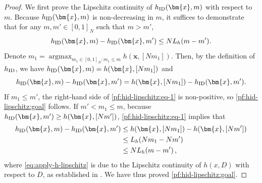 \documentclass{article}
\theoremstyle{plain}
\theoremstyle{remark}
\newcommand{\mx}{\bm{x}}
\newcommand{\hid}{h_{\textnormal{ID}}}
\newcommand{\ID}{\textnormal{ID}}
\DeclareMathOperator*{\argmax}{argmax}
\begin{document}
\begin{proof}\label{proof:hID drift}
    We first prove the Lipschitz continuity of $\hid(\mx, m)$ with respect to $m$. 
    Because $\hid(\mx, m)$ is non-decreasing in $m$, it suffices to demonstrate that for any $m, m'\in[0,1]_N$ such that $m > m'$, 
    \begin{equation}
        \label{pf:hid-lipschitz:goal}
        \hid(\mx, m) - \hid(\mx, m') \leq NL_h (m-m').
    \end{equation}
    Denote $m_1=\argmax_{m_1\in[0,1]_N\colon m_1\leq m}h(\mx,[Nm_1])$. Then, by the definition of $h_{\ID}$, we have $h_{\ID}(\mx,m)=h(\mx,[Nm_1])$ and 
    \begin{equation}
        \label{pf:hid-lipschitz:eq-1}
        \hid(\mx, m) - \hid(\mx, m') =  h(\mx, [Nm_1]) - \hid(\mx, m'). 
    \end{equation}
    If $m_1\leq m'$, the right-hand side of \eqref{pf:hid-lipschitz:eq-1} is non-positive, so \eqref{pf:hid-lipschitz:goal} follows. 
    If $m'< m_1 \leq m$, because $\hid(\mx, m')\geq h(\mx, [Nm'])$,  \eqref{pf:hid-lipschitz:eq-1} implies that
    \begin{align}
        \nonumber
        h_{\ID}(\mx,m)-h_{\ID}(\mx,m')
        &\leq h(\mx, [Nm_1])  - h(\mx, [Nm']) \\
        \label{eq:apply-h-lipschitz}
        &\leq L_h (Nm_1-Nm')\\
        \nonumber
        &\leq NL_h(m-m')\,,
    \end{align}
    where \eqref{eq:apply-h-lipschitz} is due to the Lipschitz continuity of $h(x, D)$ with respect to $D$, as established in . 
    We have thus proved \eqref{pf:hid-lipschitz:goal}. 


\end{proof}
\end{document}
